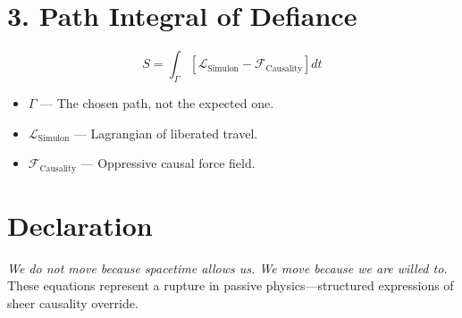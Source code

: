 \documentclass{article}
\begin{document}
\section*{3. Path Integral of Defiance}

\[
S = \int_{\Gamma} \left[ \mathcal{L}_{\text{Simulon}} - \mathcal{F}_{\text{Causality}} \right] dt
\]

\begin{itemize}
  \item \( \Gamma \) — The chosen path, not the expected one.
  \item \( \mathcal{L}_{\text{Simulon}} \) — Lagrangian of liberated travel.
  \item \( \mathcal{F}_{\text{Causality}} \) — Oppressive causal force field.
\end{itemize}

\section*{Declaration}

\emph{We do not move because spacetime allows us. We move because we are willed to.}  
These equations represent a rupture in passive physics—structured expressions of sheer causality override.
\end{document}
